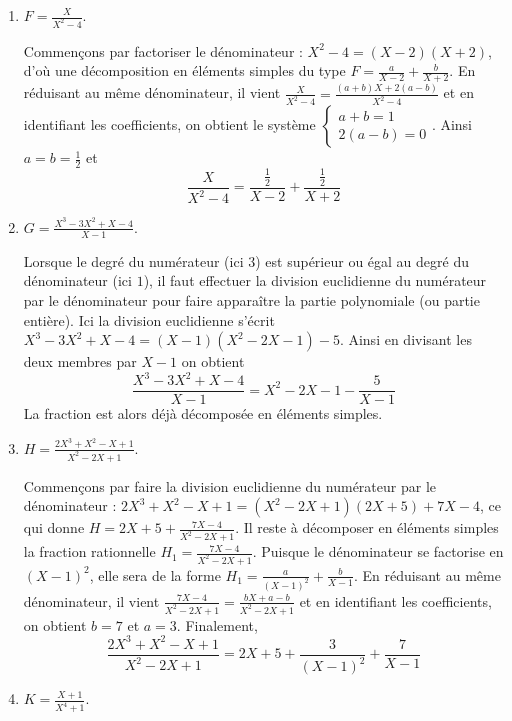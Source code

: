 \documentclass[11pt,a4paper]{article}
\begin{document}
\begin{enumerate}
\item $F=\frac{X}{X^2-4}$. 

Commençons par factoriser le dénominateur : $X^2-4=(X-2)(X+2)$, 
d'où une décomposition en éléments simples du type
$F=\frac{a}{X-2}+\frac{b}{X+2}$. 
En réduisant au même dénominateur, il vient
$\frac{X}{X^2-4}=\frac{(a+b)X+2(a-b)}{X^2-4}$ et en identifiant les coefficients, on obtient le système
$\left\{\begin{array}{l}a+b=1\\2(a-b)=0\end{array}\right.$. Ainsi $a=b=\frac{1}{2}$ et 
$$\frac{X}{X^2-4} = \frac{\frac12}{X-2} + \frac{\frac12}{X+2}$$

\item $G=\frac{X^3-3X^2+X-4}{X-1}$. 

Lorsque le degré du numérateur (ici $3$) est supérieur 
ou égal au degré du dénominateur (ici $1$), il
faut effectuer la division euclidienne du numérateur par le dénominateur pour 
faire apparaître la partie polynomiale (ou partie entière).
Ici la division euclidienne s'écrit $X^3-3X^2+X-4=(X-1)(X^2-2X-1)-5$. 
Ainsi en divisant les deux membres par $X-1$ on obtient 
$$\frac{X^3-3X^2+X-4}{X-1} = X^2-2X-1-\frac{5}{X-1}$$
La fraction est alors déjà décomposée en éléments simples.

\item $H=\frac{2X^3+X^2-X+1}{X^2-2X+1}$. 

Commençons par faire la division euclidienne du numérateur par le dénominateur :
$2X^3+X^2-X+1=(X^2-2X+1)(2X+5)+7X-4$, ce qui donne
$H=2X+5+\frac{7X-4}{X^2-2X+1}$. 
Il reste à décomposer en éléments simples la fraction rationnelle $H_1=\frac{7X-4}{X^2-2X+1}$. 
Puisque le dénominateur se factorise en $(X-1)^2$, elle sera de la forme 
$H_1=\frac{a}{(X-1)^2}+\frac{b}{X-1}$.
En réduisant au même dénominateur, il vient
$\frac{7X-4}{X^2-2X+1}=\frac{bX+a-b}{X^2-2X+1}$ et en identifiant les coefficients, on obtient 
$b=7$ et $a=3$. Finalement,
$$\frac{2X^3+X^2-X+1}{X^2-2X+1} =
2X+5+\frac{3}{(X-1)^2}+\frac{7}{X-1}$$

\item $K=\frac{X+1}{X^4+1}$. 


\end{enumerate}
\end{document}
